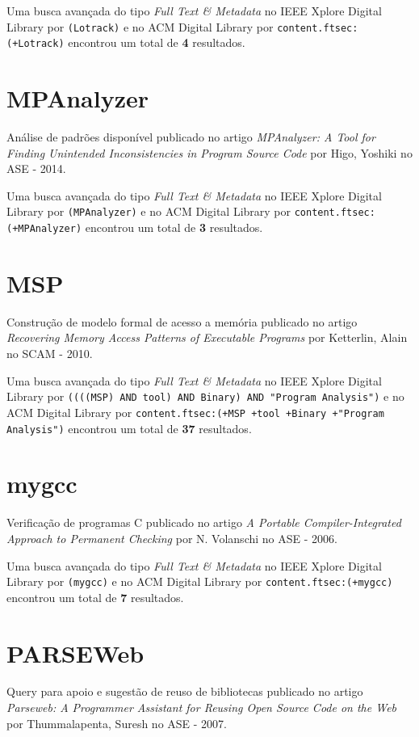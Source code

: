 Uma busca avançada do tipo {\it Full Text \& Metadata} no IEEE Xplore Digital Library por
\texttt{(Lotrack)}
e no ACM Digital Library por
\texttt{content.ftsec:(+Lotrack)}
encontrou um total de
{\bf 4}
resultados.

\section{MPAnalyzer}

Análise de padrões disponível
publicado no artigo
{\it MPAnalyzer: A Tool for Finding Unintended Inconsistencies in Program Source Code}
por
Higo, Yoshiki
no
ASE
-
2014.


Uma busca avançada do tipo {\it Full Text \& Metadata} no IEEE Xplore Digital Library por
\texttt{(MPAnalyzer)}
e no ACM Digital Library por
\texttt{content.ftsec:(+MPAnalyzer)}
encontrou um total de
{\bf 3}
resultados.

\section{MSP}

Construção de modelo formal de acesso a memória
publicado no artigo
{\it Recovering Memory Access Patterns of Executable Programs}
por
Ketterlin, Alain
no
SCAM
-
2010.


Uma busca avançada do tipo {\it Full Text \& Metadata} no IEEE Xplore Digital Library por
\texttt{((((MSP) AND tool) AND Binary) AND "Program Analysis")}
e no ACM Digital Library por
\texttt{content.ftsec:(+MSP +tool +Binary +"Program Analysis")}
encontrou um total de
{\bf 37}
resultados.

\section{mygcc}

Verificação de programas C
publicado no artigo
{\it A Portable Compiler-Integrated Approach to Permanent Checking}
por
N. Volanschi
no
ASE
-
2006.


Uma busca avançada do tipo {\it Full Text \& Metadata} no IEEE Xplore Digital Library por
\texttt{(mygcc)}
e no ACM Digital Library por
\texttt{content.ftsec:(+mygcc)}
encontrou um total de
{\bf 7}
resultados.

\section{PARSEWeb}

Query para apoio e sugestão de reuso de bibliotecas
publicado no artigo
{\it Parseweb: A Programmer Assistant for Reusing Open Source Code on the Web}
por
Thummalapenta, Suresh
no
ASE
-
2007.


